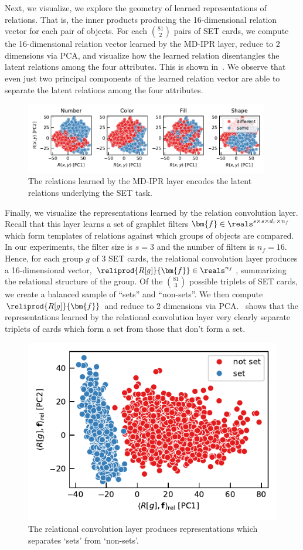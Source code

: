 Next, we visualize, we explore the geometry of learned representations of relations. That is, the inner products producing the 16-dimensional relation vector for each pair of objects. For each $\binom{81}{2}$ pairs of SET cards, we compute the 16-dimensional relation vector learned by the MD-IPR layer, reduce to 2 dimensions via PCA, and visualize how the learned relation disentangles the latent relations among the four attributes. This is shown in~. We observe that even just two principal components of the learned relation vector are able to separate the latent relations among the four attributes.

\begin{figure}[h]
    \centering
    \includegraphics[width=0.95\textwidth]{figs/representation_analysis/mdipr_rel_rep.pdf}
    \caption{The relations learned by the MD-IPR layer encodes the latent relations underlying the SET task.}\label{fig:mdipr_rel_rep}
\end{figure}

Finally, we visualize the representations learned by the relation convolution layer. Recall that this layer learns a set of graphlet filters $\bm{f} \in \reals^{s \times s \times d_r \times n_f}$ which form templates of relations against which groups of objects are compared. In our experiments, the filter size is $s = 3$ and the number of filters is $n_f = 16$. Hence, for each group $g$ of 3 SET cards, the relational convolution layer produces a 16-dimensional vector, $\reliprod{R[g]}{\bm{f}} \in \reals^{n_f}$, summarizing the relational structure of the group. Of the $\binom{81}{3}$ possible triplets of SET cards, we create a balanced sample of ``sets'' and ``non-sets''. We then compute $\reliprod{R[g]}{\bm{f}}$ and reduce to 2 dimensions via PCA.~ shows that the representations learned by the relational convolution layer very clearly separate triplets of cards which form a set from those that don't form a set.

\begin{figure}[h]
    \centering
    \includegraphics{figs/representation_analysis/conv_rep.pdf}
    \caption{The relational convolution layer produces representations which separates `sets' from `non-sets'.}\label{fig:conv_rep}
\end{figure}